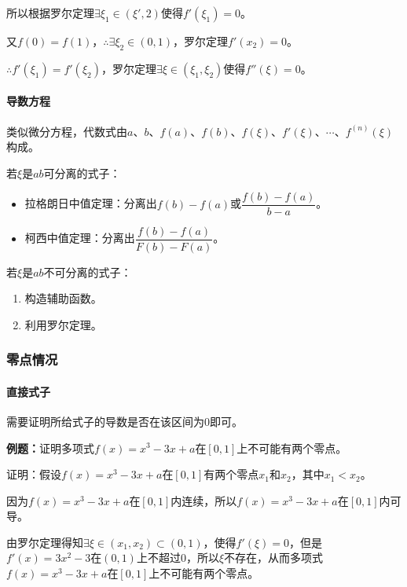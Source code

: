 \documentclass[UTF8, 12pt]{ctexart}
\begin{document}
所以根据罗尔定理$\exists\xi_1\in(\xi',2)$使得$f'(\xi_1)=0$。

又$f(0)=f(1)$，$\therefore\exists\xi_2\in(0,1)$，罗尔定理$f'(x_2)=0$。

$\therefore f'(\xi_1)=f'(\xi_2)$，罗尔定理$\exists\xi\in(\xi_1,\xi_2)$使得$f''(\xi)=0$。

\paragraph{导数方程} \leavevmode \medskip

类似微分方程，代数式由$a$、$b$、$f(a)$、$f(b)$、$f(\xi)$、$f'(\xi)$、$\cdots$、$f^{(n)}(\xi)$构成。

若$\xi$是$ab$可分离的式子：

\begin{itemize}
    \item 拉格朗日中值定理：分离出$f(b)-f(a)$或$\dfrac{f(b)-f(a)}{b-a}$。
    \item 柯西中值定理：分离出$\dfrac{f(b)-f(a)}{F(b)-F(a)}$。
\end{itemize}

若$\xi$是$ab$不可分离的式子：

\begin{enumerate}
    \item 构造辅助函数。
    \item 利用罗尔定理。
\end{enumerate}

\subsubsection{零点情况}

\paragraph{直接式子} \leavevmode \medskip

需要证明所给式子的导数是否在该区间为0即可。

\textbf{例题：}证明多项式$f(x)=x^3-3x+a$在$[0,1]$上不可能有两个零点。

证明：假设$f(x)=x^3-3x+a$在$[0,1]$有两个零点$x_1$和$x_2$，其中$x_1<x_2$。

因为$f(x)=x^3-3x+a$在$[0,1]$内连续，所以$f(x)=x^3-3x+a$在$[0,1]$内可导。

由罗尔定理得知$\exists\xi\in(x_1,x_2)\subset(0,1)$，使得$f'(\xi)=0$，但是$f'(x)=3x^2-3$在$(0,1)$上不超过0，所以$\xi$不存在，从而多项式$f(x)=x^3-3x+a$在$[0,1]$上不可能有两个零点。
\end{document}
